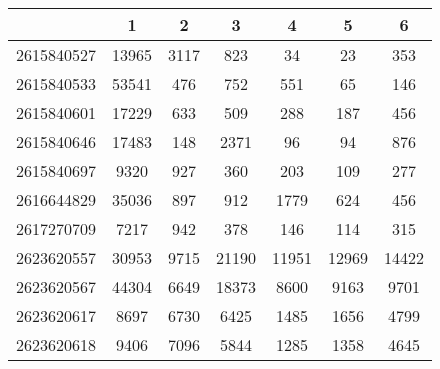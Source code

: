 \begin{tabular}{|l||c|c|c|c|c|c|}
\hline
& 1 & 2 & 3 & 4 & 5 & 6 \\
\hline
\hline
2615840527 & \cellcolor[RGB]{235, 71, 71} 13965 & \cellcolor[RGB]{235, 71, 71} 3117 & \cellcolor[RGB]{253, 241, 241} 823 & \cellcolor[RGB]{227, 227, 252} 34 & \cellcolor[RGB]{223, 223, 251} 23 & \cellcolor[RGB]{241, 241, 253} 353 \\
\hline
2615840533 & \cellcolor[RGB]{235, 71, 71} 53541 & \cellcolor[RGB]{250, 250, 254} 476 & \cellcolor[RGB]{251, 223, 223} 752 & \cellcolor[RGB]{254, 250, 250} 551 & \cellcolor[RGB]{214, 214, 250} 65 & \cellcolor[RGB]{218, 218, 251} 146 \\
\hline
2615840601 & \cellcolor[RGB]{235, 71, 71} 17229 & \cellcolor[RGB]{251, 218, 218} 633 & \cellcolor[RGB]{254, 250, 250} 509 & \cellcolor[RGB]{223, 223, 251} 288 & \cellcolor[RGB]{205, 205, 249} 187 & \cellcolor[RGB]{250, 250, 254} 456 \\
\hline
2615840646 & \cellcolor[RGB]{235, 71, 71} 17483 & \cellcolor[RGB]{232, 232, 252} 148 & \cellcolor[RGB]{235, 71, 71} 2371 & \cellcolor[RGB]{232, 232, 252} 96 & \cellcolor[RGB]{232, 232, 252} 94 & \cellcolor[RGB]{252, 232, 232} 876 \\
\hline
2615840697 & \cellcolor[RGB]{235, 71, 71} 9320 & \cellcolor[RGB]{235, 71, 71} 927 & \cellcolor[RGB]{253, 241, 241} 360 & \cellcolor[RGB]{223, 223, 251} 203 & \cellcolor[RGB]{200, 200, 249} 109 & \cellcolor[RGB]{246, 246, 254} 277 \\
\hline
2616644829 & \cellcolor[RGB]{235, 71, 71} 35036 & \cellcolor[RGB]{255, 255, 255} 897 & \cellcolor[RGB]{255, 255, 255} 912 & \cellcolor[RGB]{235, 71, 71} 1779 & \cellcolor[RGB]{218, 218, 251} 624 & \cellcolor[RGB]{195, 195, 248} 456 \\
\hline
2617270709 & \cellcolor[RGB]{235, 71, 71} 7217 & \cellcolor[RGB]{235, 71, 71} 942 & \cellcolor[RGB]{254, 246, 246} 378 & \cellcolor[RGB]{223, 223, 251} 146 & \cellcolor[RGB]{218, 218, 251} 114 & \cellcolor[RGB]{250, 250, 254} 315 \\
\hline
2623620557 & \cellcolor[RGB]{235, 71, 71} 30953 & \cellcolor[RGB]{186, 186, 247} 9715 & \cellcolor[RGB]{235, 71, 71} 21190 & \cellcolor[RGB]{227, 227, 252} 11951 & \cellcolor[RGB]{241, 241, 253} 12969 & \cellcolor[RGB]{253, 241, 241} 14422 \\
\hline
2623620567 & \cellcolor[RGB]{235, 71, 71} 44304 & \cellcolor[RGB]{94, 94, 237} 6649 & \cellcolor[RGB]{235, 71, 71} 18373 & \cellcolor[RGB]{223, 223, 251} 8600 & \cellcolor[RGB]{246, 246, 254} 9163 & \cellcolor[RGB]{253, 241, 241} 9701 \\
\hline
2623620617 & \cellcolor[RGB]{251, 218, 218} 8697 & \cellcolor[RGB]{253, 241, 241} 6730 & \cellcolor[RGB]{254, 246, 246} 6425 & \cellcolor[RGB]{223, 223, 251} 1485 & \cellcolor[RGB]{223, 223, 251} 1656 & \cellcolor[RGB]{250, 250, 254} 4799 \\
\hline
2623620618 & \cellcolor[RGB]{249, 205, 205} 9406 & \cellcolor[RGB]{252, 232, 232} 7096 & \cellcolor[RGB]{254, 246, 246} 5844 & \cellcolor[RGB]{223, 223, 251} 1285 & \cellcolor[RGB]{223, 223, 251} 1358 & \cellcolor[RGB]{250, 250, 254} 4645 \\
\hline
\end{tabular}
